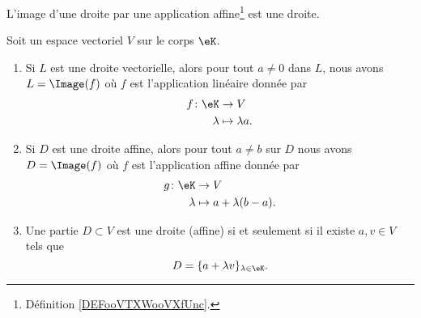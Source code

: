 \begin{proposition}     \label{PROPooNTHVooWWyafJ}
	L'image d'une droite par une application affine\footnote{Définition \ref{DEFooVTXWooVXfUnc}.} est une droite.
\end{proposition}

\begin{lemma}       \label{LEMooRWASooOfwjdw}
    Soit un espace vectoriel \( V\) sur le corps \( \eK\).
	\begin{enumerate}
		\item       \label{ITEMooYQCIooOrhRwj}
		      Si \( L\) est une droite vectorielle, alors pour tout \( a\neq 0\) dans \( L\), nous avons \( L=\Image(f)\) où \( f\) est l'application linéaire donnée par
		      \begin{equation}
			      \begin{aligned}
				      f\colon \eK & \to V              \\
				      \lambda     & \mapsto \lambda a.
			      \end{aligned}
		      \end{equation}
		\item       \label{ITEMooZIGMooGruFMP}
		      Si \( D\) est une droite affine, alors pour tout \( a\neq b\) sur \( D\) nous avons \( D=\Image(f)\) où \( f\) est l'application affine donnée par
		      \begin{equation}
			      \begin{aligned}
				      g\colon \eK & \to V                   \\
				      \lambda     & \mapsto a+\lambda(b-a).
			      \end{aligned}
		      \end{equation}
          \item     \label{ITEMooOKJZooIHYDIk}
              Une partie \( D\subset V\) est une droite (affine) si et seulement si il existe \( a,v\in V\) tels que
              \begin{equation}
                  D=\{ a+\lambda v \}_{\lambda\in \eK}.
              \end{equation}
	\end{enumerate}
\end{lemma}

